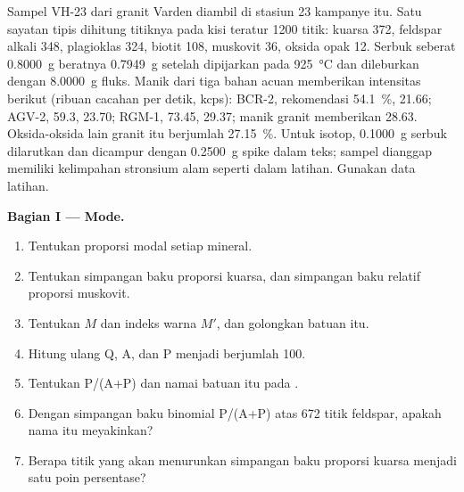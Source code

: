\begin{problem}\label{pb:b2:field-lab-methods-2:1}
Sampel VH-23 dari granit Varden diambil di stasiun 23 kampanye itu. Satu sayatan tipis
dihitung titiknya pada kisi teratur 1200 titik: kuarsa 372, feldspar alkali 348, plagioklas 324,
biotit 108, muskovit 36, oksida opak 12. Serbuk seberat \qty{0.8000}{g} beratnya \qty{0.7949}{g}
setelah dipijarkan pada \qty{925}{\celsius} dan dileburkan dengan \qty{8.0000}{g} fluks. Manik dari tiga
bahan acuan memberikan intensitas  berikut (ribuan cacahan per detik, kcps): BCR-2,
rekomendasi \qty{54.1}{\percent}, 21.66; AGV-2, 59.3, 23.70; RGM-1, 73.45, 29.37; manik granit
memberikan 28.63. Oksida-oksida lain granit itu berjumlah \qty{27.15}{\percent}. Untuk isotop,
\qty{0.1000}{g} serbuk dilarutkan dan dicampur dengan \qty{0.2500}{g} spike dalam teks;
sampel dianggap memiliki kelimpahan stronsium alam seperti dalam latihan. Gunakan data
latihan.

\noindent\textbf{Bagian I --- Mode.}
\begin{enumerate}
  \item Tentukan proporsi modal setiap mineral.
  \item Tentukan simpangan baku proporsi kuarsa, dan simpangan baku relatif
        proporsi muskovit.
  \item Tentukan $M$ dan indeks warna $M'$, dan golongkan batuan itu.
  \item Hitung ulang Q, A, dan P menjadi berjumlah 100.
  \item Tentukan P/(A+P) dan namai batuan itu pada .
  \item Dengan simpangan baku binomial P/(A+P) atas 672 titik feldspar, apakah nama itu
        meyakinkan?
  \item Berapa titik yang akan menurunkan simpangan baku proporsi kuarsa menjadi satu
        poin persentase?
\end{enumerate}


\end{problem}
